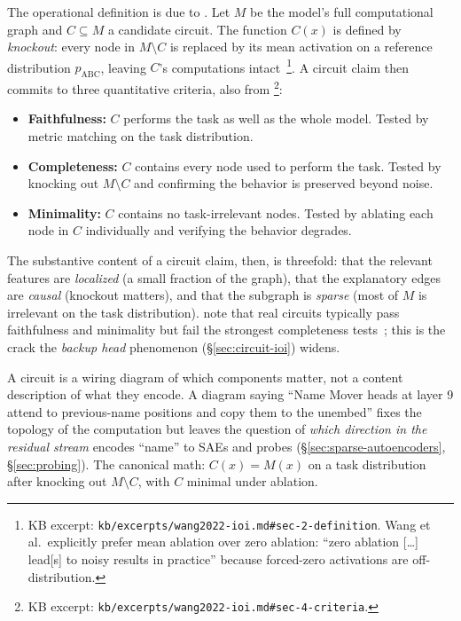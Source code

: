 The operational definition is due to \citet{wang2022-ioi}. Let $M$ be
the model's full computational graph and $C \subseteq M$ a candidate
circuit. The function $C(x)$ is defined by \emph{knockout}: every node
in $M \setminus C$ is replaced by its mean activation on a reference
distribution $p_{\text{ABC}}$, leaving $C$'s computations
intact~\citep[\S 2]{wang2022-ioi}\footnote{KB excerpt:
\texttt{kb/excerpts/wang2022-ioi.md\#sec-2-definition}. Wang et al.\
explicitly prefer mean ablation over zero ablation: ``zero ablation
[\ldots] lead[s] to noisy results in practice'' because forced-zero
activations are off-distribution.}. A circuit claim then commits to
three quantitative criteria, also from
\citet[\S 4]{wang2022-ioi}\footnote{KB excerpt:
\texttt{kb/excerpts/wang2022-ioi.md\#sec-4-criteria}.}:
\begin{itemize}
  \item \textbf{Faithfulness:} $C$ performs the task as well as the
    whole model. Tested by metric matching on the task distribution.
  \item \textbf{Completeness:} $C$ contains every node used to perform
    the task. Tested by knocking out $M \setminus C$ and confirming
    the behavior is preserved beyond noise.
  \item \textbf{Minimality:} $C$ contains no task-irrelevant nodes.
    Tested by ablating each node in $C$ individually and verifying the
    behavior degrades.
\end{itemize}
The substantive content of a circuit claim, then, is threefold: that
the relevant features are \emph{localized} (a small fraction of the
graph), that the explanatory edges are \emph{causal} (knockout matters),
and that the subgraph is \emph{sparse} (most of $M$ is irrelevant on
the task distribution). \citet{wang2022-ioi} note that real circuits
typically pass faithfulness and minimality but fail the strongest
completeness tests~\citep[\S 4]{wang2022-ioi}; this is the crack the
\emph{backup head} phenomenon (\S\ref{sec:circuit-ioi}) widens.

\begin{intuition}
A circuit is a wiring diagram of which components matter, not a content
description of what they encode. A diagram saying ``Name Mover heads at
layer 9 attend to previous-name positions and copy them to the
unembed'' fixes the topology of the computation but leaves the question
of \emph{which direction in the residual stream} encodes ``name'' to
SAEs and probes (\S\ref{sec:sparse-autoencoders}, \S\ref{sec:probing}).
The canonical math: $C(x) = M(x)$ on a task distribution after knocking
out $M \setminus C$, with $C$ minimal under ablation.
\end{intuition}

